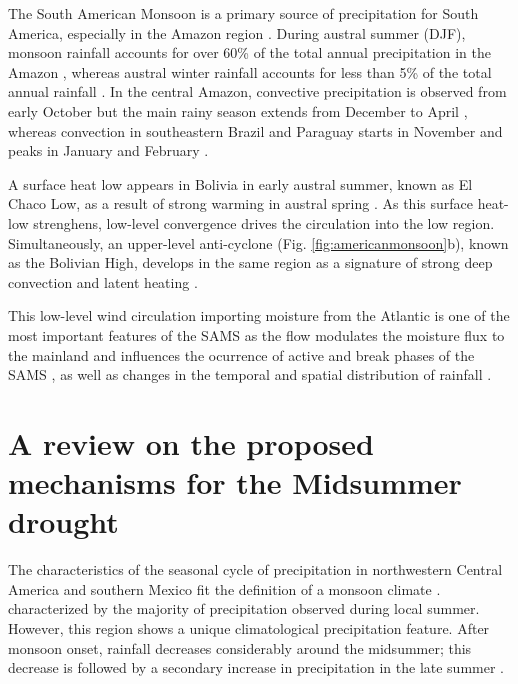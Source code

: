 The South American Monsoon is a primary source of precipitation for South America, especially in the Amazon region \citep{gan2004,vera2006,jones2013}.
During austral summer (DJF), monsoon rainfall accounts for over 60\% of the total annual precipitation in the Amazon \citep{gan2004,marengo2012}, whereas
austral winter rainfall accounts for less than 5\% of the total annual rainfall \citep{vera2006}.
In the central Amazon, convective precipitation is observed from early October but the main rainy season extends from December to April \citep{machado2004,adams2013}, whereas convection in southeastern Brazil and Paraguay starts in November and peaks in January and February \citep{marengo2001,nieto2011}. 

A surface heat low appears in Bolivia in early austral summer, known as El Chaco Low, as a result of strong warming in austral spring \citep{marengo2012,sulca2018}.
 As this surface heat-low strenghens, low-level convergence drives the circulation into the low region.
 Simultaneously, an upper-level anti-cyclone (Fig. \ref{fig:americanmonsoon}b), known as the Bolivian High, develops in the same region as a signature of strong deep convection and latent heating \citep{marengo2001,vera2006}.

This low-level wind circulation importing moisture from the Atlantic is one of the most important features of the SAMS \citep{marengo2012,wang2017} as the flow modulates the moisture flux to the mainland and influences the ocurrence of active and break phases of the SAMS \citep{jones2002}, as well as changes in the temporal and spatial
distribution of rainfall \citep[e.g.][]{giannini2004,bombardi2011}.


\section{A review on the proposed mechanisms for the Midsummer drought}\label{sq:litmsd}


The characteristics of the seasonal cycle of precipitation in northwestern Central America and southern Mexico fit the definition of a monsoon climate \citep{wang2017}. characterized by the majority of precipitation observed during local summer. 
However, this region shows a unique climatological precipitation feature. After monsoon onset, rainfall decreases considerably around the midsummer; this decrease is followed by a secondary increase in precipitation in the late summer \citep{mosino1966}. 


